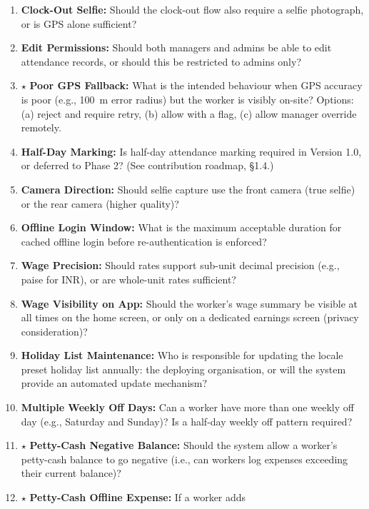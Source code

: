 \documentclass[12pt, a4paper]{article}
\begin{document}
\begin{enumerate}
    \item \textbf{Clock-Out Selfie:} Should the clock-out flow also
          require a selfie photograph, or is GPS alone sufficient?
    \item \textbf{Edit Permissions:} Should both managers and admins be
          able to edit attendance records, or should this be restricted
          to admins only?
    \item $\star$ \textbf{Poor GPS Fallback:} What is the intended
          behaviour when GPS accuracy is poor (e.g., 100~m error radius)
          but the worker is visibly on-site? Options: (a) reject and
          require retry, (b) allow with a flag, (c) allow manager
          override remotely.
    \item \textbf{Half-Day Marking:} Is half-day attendance marking
          required in Version 1.0, or deferred to Phase 2? (See
          contribution roadmap, \S1.4.)
    \item \textbf{Camera Direction:} Should selfie capture use the front
          camera (true selfie) or the rear camera (higher quality)?
    \item \textbf{Offline Login Window:} What is the maximum acceptable
          duration for cached offline login before re-authentication
          is enforced?
    \item \textbf{Wage Precision:} Should rates support sub-unit decimal
          precision (e.g., paise for INR), or are whole-unit rates
          sufficient?
    \item \textbf{Wage Visibility on App:} Should the worker's wage
          summary be visible at all times on the home screen, or only
          on a dedicated earnings screen (privacy consideration)?
    \item \textbf{Holiday List Maintenance:} Who is responsible for
          updating the locale preset holiday list annually: the deploying
          organisation, or will the system provide an automated update
          mechanism?
    \item \textbf{Multiple Weekly Off Days:} Can a worker have more than
          one weekly off day (e.g., Saturday and Sunday)? Is a half-day
          weekly off pattern required?
    \item $\star$ \textbf{Petty-Cash Negative Balance:} Should the
          system allow a worker's petty-cash balance to go negative
          (i.e., can workers log expenses exceeding their current
          balance)?
    \item $\star$ \textbf{Petty-Cash Offline Expense:} If a worker adds

\end{enumerate}
\end{document}

